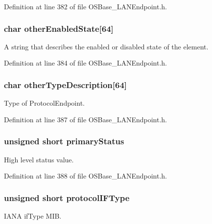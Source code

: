 Definition at line 382 of file OSBase\_\-LANEndpoint.h.\hypertarget{struct_l_a_n_endpoint_ada8b1d0abb5f880f6c578111185472d0}{
\subsubsection[{otherEnabledState}]{\setlength{\rightskip}{0pt plus 5cm}char {\bf otherEnabledState}\mbox{[}64\mbox{]}}}
\label{struct_l_a_n_endpoint_ada8b1d0abb5f880f6c578111185472d0}
A string that describes the enabled or disabled state of the element. 

Definition at line 384 of file OSBase\_\-LANEndpoint.h.\hypertarget{struct_l_a_n_endpoint_ae3a0e27b88cd9e2a8cc4cfe80b63d320}{
\subsubsection[{otherTypeDescription}]{\setlength{\rightskip}{0pt plus 5cm}char {\bf otherTypeDescription}\mbox{[}64\mbox{]}}}
\label{struct_l_a_n_endpoint_ae3a0e27b88cd9e2a8cc4cfe80b63d320}
Type of ProtocolEndpoint. 

Definition at line 387 of file OSBase\_\-LANEndpoint.h.\hypertarget{struct_l_a_n_endpoint_a83b43042974812be35c3c4327fc06150}{
\subsubsection[{primaryStatus}]{\setlength{\rightskip}{0pt plus 5cm}unsigned short {\bf primaryStatus}}}
\label{struct_l_a_n_endpoint_a83b43042974812be35c3c4327fc06150}
High level status value. 

Definition at line 388 of file OSBase\_\-LANEndpoint.h.\hypertarget{struct_l_a_n_endpoint_a414e382ad7c2c6ec9c934cfe5ca96dda}{
\subsubsection[{protocolIFType}]{\setlength{\rightskip}{0pt plus 5cm}unsigned short {\bf protocolIFType}}}
\label{struct_l_a_n_endpoint_a414e382ad7c2c6ec9c934cfe5ca96dda}
IANA ifType MIB. 


